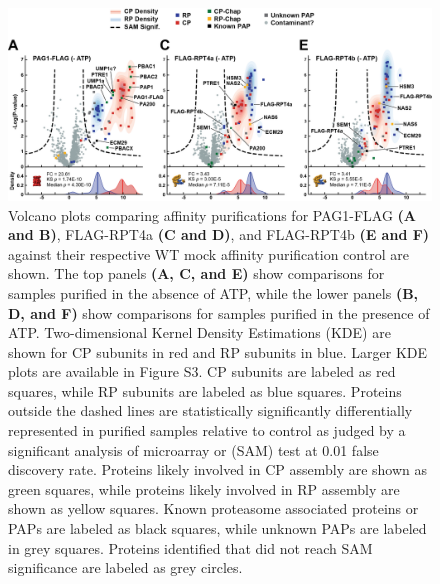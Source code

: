 \begin{figure}
	\centering
	\includegraphics[width=\columnwidth]{Proteasome/Volcanosplit1.png}
	{Volcano plots comparing affinity purifications for PAG1-FLAG \textbf{(A and B)}, FLAG-RPT4a \textbf{(C and D)}, and FLAG-RPT4b \textbf{(E and F)} against their respective WT mock affinity purification control are shown. The top panels \textbf{(A, C, and E)} show comparisons for samples purified in the absence of ATP, while the lower panels \textbf{(B, D, and F)} show comparisons for samples purified in the presence of ATP. Two-dimensional Kernel Density Estimations (KDE) are shown for CP subunits in red and RP subunits in blue. Larger KDE plots are available in Figure S3. CP subunits are labeled as red squares, while RP subunits are labeled as blue squares. Proteins outside the dashed lines are statistically significantly differentially represented in purified samples relative to control as judged by a significant analysis of microarray or (SAM) test at 0.01 false discovery rate. Proteins likely involved in CP assembly are shown as green squares, while proteins likely involved in RP assembly are shown as yellow squares. Known proteasome associated proteins or PAPs are labeled as black squares, while unknown PAPs are labeled in grey squares. Proteins identified that did not reach SAM significance are labeled as grey circles.}
	\label{fig:volcanos1}
\end{figure}

